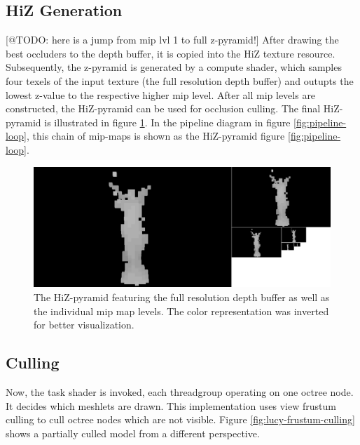 \subsection*{HiZ Generation} \label{subsec-highz-generation}

[@TODO: here is a jump from mip lvl 1 to full z-pyramid!]
After drawing the best occluders to the depth buffer, it is copied into the \ac{HiZ} texture resource. Subsequently, 
the z-pyramid is generated by a compute shader, which samples four texels of the input texture (the full resolution 
depth buffer) and outupts the lowest z-value to the respective higher mip level. After all mip levels are constructed, 
the \ac{HiZ}-pyramid can be used for occlusion culling. The final \ac{HiZ}-pyramid is illustrated in figure 
\ref{fig:lucy-hiz-pyramid}. In the pipeline diagram in figure \ref{fig:pipeline-loop}, this chain of mip-maps is shown 
as the \ac{HiZ}-pyramid  figure \ref{fig:pipeline-loop}.

\begin{figure}[h]
    \centering
    \includegraphics[width=\linewidth]{images/graphics/lucy-hiz-pyramid-inverted.jpg}
    \caption{The \ac{HiZ}-pyramid featuring the full resolution depth buffer as well as the individual mip map 
    levels. The color representation was inverted for better visualization.}
    \label{fig:lucy-hiz-pyramid}
\end{figure}


\subsection*{Culling} \label{subsec-task-shader}

Now, the task shader is invoked, each threadgroup operating on one octree node. It decides which 
meshlets are drawn. This implementation uses view frustum culling to cull octree nodes which are 
not visible. Figure \ref{fig:lucy-frustum-culling} shows a partially culled model from a different 
perspective. 

